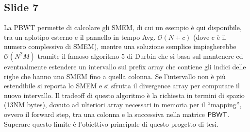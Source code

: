\documentclass[a4paper,11pt, oneside,italian]{article}
\def\PBWT{\mbox{\rm {\sf PBWT}}}
\begin{document}
\subsection*{Slide 7}
La PBWT permette di calcolare gli SMEM, di cui un esempio è qui disponibile,
tra un aplotipo esterno e il pannello in tempo Avg. $\mathcal{O}(N + c)$ (dove c
è il numero complessivo di SMEM), mentre una soluzione semplice impiegherebbe
$\mathcal{O}(N^2M)$ tramite il famoso algoritmo 5 di Durbin che si basa sul
mantenere ed eventualmente estendere un intervallo sui prefix array che contiene
gli indici delle righe che hanno uno SMEM fino a quella colonna. Se l'intervallo
non è più estendibile si reporta lo SMEM e si sfrutta il divergence array per
computare il nuovo intervallo.
Il tradeoff di questo algoritmo è la richiesta in termini di spazio (13NM
bytes), dovuto ad ulteriori array necessari in memoria per il ``mapping'',
ovvero il forward step, tra una colonna e la successiva nella matrice
$\PBWT$. Superare questo limite è l’obiettivo principale di questo progetto di
tesi.
\end{document}
